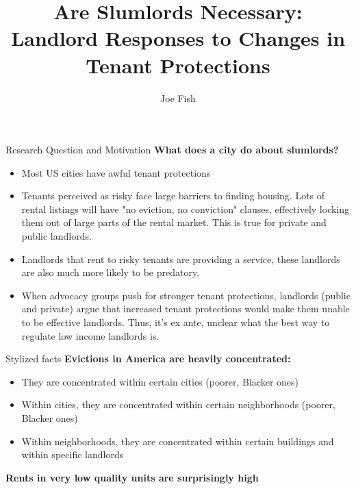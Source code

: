 \documentclass[10pt, xcolor=dvipsnames]{beamer}
\date{}
\title[Landlord Responses to Changes in Tenant Protections]{Are Slumlords Necessary: \\Landlord Responses to Changes in Tenant Protections} %
\author[Joe Fish]{Joe Fish}
\begin{document}
\begin{frame}
\titlepage %
\end{frame}


\begin{frame}{Research Question and Motivation}
   \textbf{ What does a city do about slumlords?}
   \begin{itemize}
    \item Most US cities have awful tenant protections
    \item Tenants perceived as risky face large barriers to finding housing. Lots of rental listings will have "no eviction, no conviction" clauses, effectively locking them out of large parts of the rental market. This is true for private and public landlords.
    \item Landlords that rent to risky tenants are providing a service, these landlords are also much more likely to be predatory.
    \item When advocacy groups push for stronger tenant protections, landlords (public and private) argue that increased tenant protections would make them unable to be effective landlords. Thus, it's ex ante, unclear what the best way to regulate low income landlords is.
\end{itemize}
\end{frame}

\begin{frame}{Stylized facts}
    \textbf{Evictions in America are heavily concentrated:}
\begin{itemize}
    \item They are concentrated within certain cities (poorer, Blacker ones)
    \item Within cities, they are concentrated within certain neighborhoods (poorer, Blacker ones)
    \item Within neighborhoods, they are concentrated within certain buildings and within specific landlords 
\end{itemize} 
    \textbf{Rents in very low quality units are surprisingly high }
\end{frame}

    
\end{document}
